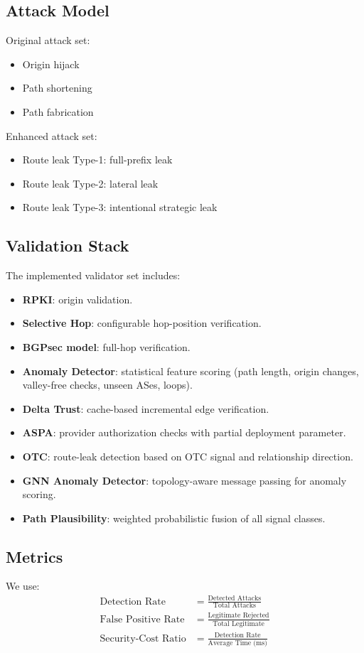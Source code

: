 \documentclass[conference]{IEEEtran}
\begin{document}
\subsection{Attack Model}
Original attack set:
\begin{itemize}
\item Origin hijack
\item Path shortening
\item Path fabrication
\end{itemize}

Enhanced attack set:
\begin{itemize}
\item Route leak Type-1: full-prefix leak
\item Route leak Type-2: lateral leak
\item Route leak Type-3: intentional strategic leak
\end{itemize}

\subsection{Validation Stack}
The implemented validator set includes:
\begin{itemize}
\item \textbf{RPKI}: origin validation.
\item \textbf{Selective Hop}: configurable hop-position verification.
\item \textbf{BGPsec model}: full-hop verification.
\item \textbf{Anomaly Detector}: statistical feature scoring (path length, origin changes, valley-free checks, unseen ASes, loops).
\item \textbf{Delta Trust}: cache-based incremental edge verification.
\item \textbf{ASPA}: provider authorization checks with partial deployment parameter.
\item \textbf{OTC}: route-leak detection based on OTC signal and relationship direction.
\item \textbf{GNN Anomaly Detector}: topology-aware message passing for anomaly scoring.
\item \textbf{Path Plausibility}: weighted probabilistic fusion of all signal classes.
\end{itemize}

\subsection{Metrics}
We use:
\begin{align}
\text{Detection Rate} &= \frac{\text{Detected Attacks}}{\text{Total Attacks}} \\
\text{False Positive Rate} &= \frac{\text{Legitimate Rejected}}{\text{Total Legitimate}} \\
\text{Security-Cost Ratio} &= \frac{\text{Detection Rate}}{\text{Average Time (ms)}}
\end{align}
\end{document}
